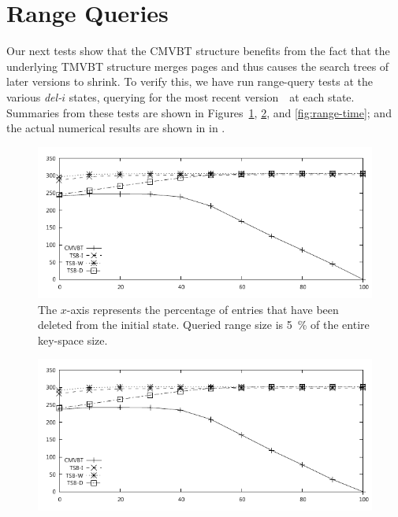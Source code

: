\section{Range Queries}
\label{sec:performance:range}

Our next tests show that the CMVBT structure benefits from the fact
that the underlying TMVBT structure merges pages and thus causes the search
trees of later versions to shrink.
To verify this, we have run range-query tests at the various
\emph{del-$i$} states, querying for the most recent version~\comver\ at each
state. 
Summaries from these tests are shown in Figures~\ref{fig:range-fix},
\ref{fig:range-read}, and \ref{fig:range-time}; and the actual numerical
results are shown in  in
.

\begin{figure}[!htb]
\begin{center}
\includegraphics[width=\testimagewidth]{images/tests/uniform/range-fix}
%
{The $x$-axis represents the percentage of entries that have been deleted from
the initial state.
Queried range size is \SI{5}{\percent} of the entire key-space size.}
\label{fig:range-fix}
\end{center}
\end{figure}

\begin{figure}[!htb]
\begin{center}
\includegraphics[width=\testimagewidth]{images/tests/uniform/range-read}
\label{fig:range-read}
\end{center}
\end{figure}

